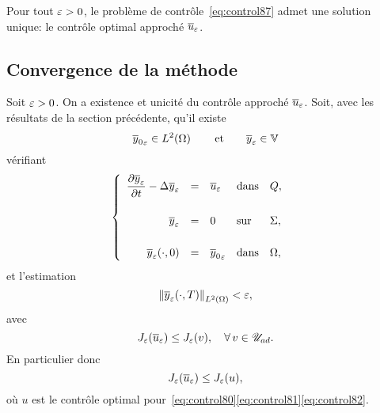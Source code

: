 \begin{proposition}%
    Pour tout $\varepsilon > 0$, le problème de contrôle~\eqref{eq:control87}
    admet une solution unique: le contrôle optimal approché ${\overline{u}}_{\varepsilon}$.
\end{proposition}

\subsection{Convergence de la méthode}\label{sec:convergence}

Soit $\varepsilon > 0$. On a existence et unicité du contrôle approché
${\overline{u}}_{\varepsilon}$. Soit, avec les résultats de la section précédente, qu'il
existe
\begin{equation*}
    {\overline{y}_{0}}_{\varepsilon}\in L^{2}\!\left({\Omega}\right)\qquad\text{et}\qquad
    {\overline{y}}_{\varepsilon}\in\mathbb{V}
\end{equation*}
vérifiant
\begin{equation}\label{eq:control89}
    \begin{cases}\displaystyle
        \begin{array}{rclll}
            \dfrac{\partial{}{\overline{y}}_{\varepsilon}}{\partial{}t} - \Delta{\overline{y}}_{\varepsilon} & = & {\overline{u}}_{\varepsilon} &
            \text{dans} & Q,\\
            \\
            {\overline{y}}_{\varepsilon} & = & 0 & \text{sur} & \Sigma,\\
            \\
            {{\overline{y}}_{\varepsilon}}\!\left({\cdot, 0}\right) & = & {\overline{y}_{0}}_{\varepsilon} &
            \text{dans} & \Omega,
        \end{array}
    \end{cases}
\end{equation}
et l'estimation
\begin{equation*}
    {\left\|{ { {\overline{y}}_{\varepsilon} }\!\left({\cdot,T}\right)   }\right\|}_{L^{2}\left({\Omega}\right)} < \varepsilon,
\end{equation*}
avec
\begin{equation*}
    J_{\varepsilon}\!\left({{\overline{u}}_{\varepsilon}}\right)\leq J_{\varepsilon}(v),\quad
    \forall\,v\in{\mathscr{U}}_{ad}.
\end{equation*}
En particulier donc
\begin{equation}\label{eq:control92}
    J_{\varepsilon}\!\left({{\overline{u}}_{\varepsilon}}\right) \leq J_{\varepsilon}(u),
\end{equation}
où $u$ est le contrôle optimal
pour~\eqref{eq:control80}\eqref{eq:control81}\eqref{eq:control82}.

